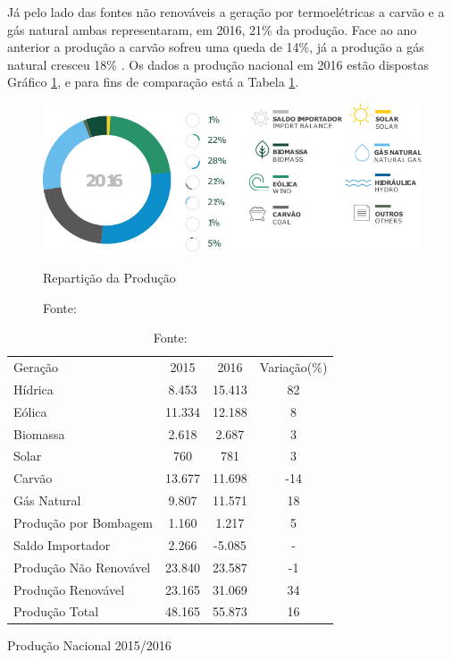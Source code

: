 Já pelo lado das fontes não renováveis a geração por termoelétricas a carvão e a gás natural ambas representaram, em 2016, 21\% da produção. Face ao ano anterior a produção a carvão sofreu uma queda de 14\%, já a produção a gás natural cresceu 18\% \cite[p.~8]{REN}. Os dados a produção nacional em 2016 estão dispostas Gráfico \ref{fig:ReparticaoDaProducao}, e para fins de comparação está a Tabela \ref{tab:producao20152016}.

\begin{figure}[H]
	\centering
	\captionsetup{width=0.7\textwidth, font=footnotesize, textfont=bf}
	\includegraphics[width=0.7\linewidth]{img/ReparticaoDaProducao2016.pdf}
	\caption{Repartição da Produção}
	\vspace{-3.5mm}
	\caption*{Fonte: }
	\label{fig:ReparticaoDaProducao}
\end{figure}

\begin{table}[H]
	\centering
	\captionsetup{width=0.74\textwidth, font=footnotesize, textfont=bf}
    \begin{tabular}{|l|c|c|c|}
    \rowcolor[HTML]{000000}
    {\color[HTML]{FFFFFF} Geração} & {\color[HTML]{FFFFFF} 2015} & {\color[HTML]{FFFFFF} 2016}   & {\color[HTML]{FFFFFF} Variação(\%) }  \\
    Hídrica                 & 8.453  & 15.413 & 82           \\
    Eólica                  & 11.334 & 12.188 & 8            \\
    Biomassa                & 2.618  & 2.687  & 3            \\
    Solar                   & 760    &  781   & 3            \\
    Carvão                  & 13.677 & 11.698 & -14          \\
    Gás Natural             & 9.807  & 11.571 & 18           \\
    Produção por Bombagem   & 1.160  & 1.217  & 5            \\
    Saldo Importador        & 2.266  & -5.085 & -            \\ \hline
    Produção Não Renovável  & 23.840 & 23.587 & -1           \\ \hline
    Produção Renovável      & 23.165 & 31.069 & 34           \\ \hline
    Produção Total          & 48.165 & 55.873 & 16           \\ \hline
    \end{tabular}
    \caption{Produção Nacional 2015/2016}
    \vspace{-3.5mm}
	\caption*{Fonte: }
    \label{tab:producao20152016}
\end{table}



